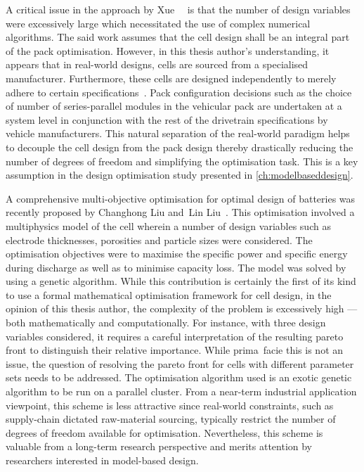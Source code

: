 A critical issue in the approach  by Xue~\etal~\cite{Xue2014} is that the number
of design variables were excessively large which necessitated the use of complex
numerical  algorithms.  The  said  work  assumes  that  the  cell  design  shall
be  an  integral  part  of  the  pack  optimisation.  However,  in  this  thesis
author's  understanding,  it  appears  that in  real-world  designs,  cells  are
sourced from a  specialised manufacturer. Furthermore, these  cells are designed
independently to merely  adhere to certain specifications~\cite{Maksimovic2012}.
Pack configuration  decisions such  as the choice  of number  of series-parallel
modules in  the vehicular pack are  undertaken at a system  level in conjunction
with the  rest of the  drivetrain specifications by vehicle  manufacturers. This
natural separation of the real-world paradigm  helps to decouple the cell design
from  the pack  design thereby  drastically reducing  the number  of degrees  of
freedom and simplifying  the optimisation task. This is a  key assumption in the
design optimisation study presented in \cref{ch:modelbaseddesign}.

A  comprehensive multi-objective  optimisation for  optimal design  of batteries
was  recently  proposed  by  Changhong  Liu  and~Lin  Liu~\cite{Liu2017b}.  This
optimisation  involved a  multiphysics model  of the  cell wherein  a number  of
design variables  such as electrode  thicknesses, porosities and  particle sizes
were considered. The optimisation objectives were to maximise the specific power
and specific energy  during discharge as well as to  minimise capacity loss. The
model  was solved  by  using a  genetic algorithm.  While  this contribution  is
certainly  the first  of  its kind  to use  a  formal mathematical  optimisation
framework for cell design, in the  opinion of this thesis author, the complexity
of the problem is excessively  high --- both mathematically and computationally.
For  instance, with  three design  variables considered,  it requires  a careful
interpretation  of the  resulting  pareto front  to  distinguish their  relative
importance. While  prima~facie this is not  an issue, the question  of resolving
the pareto front for cells with  different parameter sets needs to be addressed.
The optimisation algorithm  used is an exotic  genetic algorithm to be  run on a
parallel cluster. From a near-term industrial application viewpoint, this scheme
is less attractive  since real-world constraints, such  as supply-chain dictated
raw-material  sourcing, typically  restrict  the number  of  degrees of  freedom
available  for  optimisation.  Nevertheless,  this scheme  is  valuable  from  a
long-term research perspective and merits attention by researchers interested in
model-based design.


